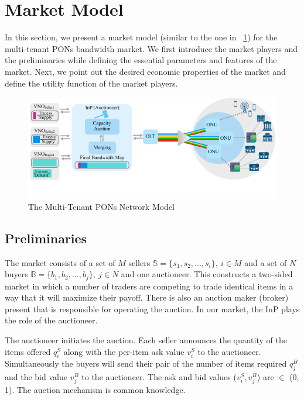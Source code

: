 \section{Market Model}
\label{sec:market-model}
In this section, we present a market model (similar to the one in \figureautorefname~\ref{Fig_model}) for the multi-tenant \acp{PON} bandwidth market. We first introduce the market players and the preliminaries while defining the essential parameters and features of the market. Next, we point out the desired economic properties of the market and define the utility function of the market players.

\begin{figure}[htbp]
  \centering
  \includegraphics[width=0.9\columnwidth]{Figures/pon.pdf}
\caption{The Multi-Tenant \acp{PON} Network Model}
\label{Fig_model}
\end{figure}

\subsection{Preliminaries}
The market consists of a set of $M$ sellers $\mathbb{S}=\{s_{1}, s_{2}, ...,s_{i}\}, \ i \in M$ and a set of $N$ buyers $\mathbb{B}=\{b_{1}, b_{2}, ...,b_{j}\}, \ j \in N$ and one auctioneer. This constructs a two-sided market in which a number of traders are competing to trade identical items in a way that it will maximize their payoff. There is also an auction maker (broker) present that is responsible for operating the auction. In our market, the \ac{InP} plays the role of the auctioneer.

The auctioneer initiates the auction. Each seller announces the quantity of the items offered $q^S_{i}$ along with the per-item ask value $v^S_{i}$ to the auctioneer. Simultaneously the buyers will send their pair of the number of items required $q^B_{j}$ and the bid value $v^B_{j}$ to the auctioneer. The ask and bid values ($v^S_{i}, v^B_{j}$) are $\in$ (0, 1). The auction mechanism is common knowledge.

